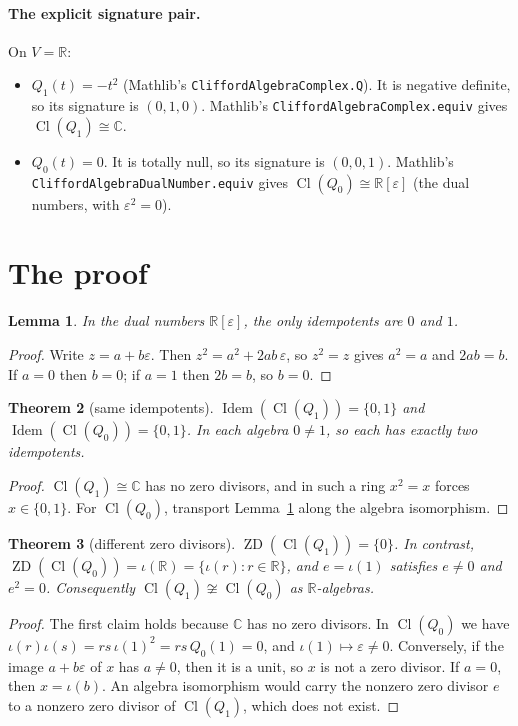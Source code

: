 \documentclass[11pt]{article}
\newtheorem{theorem}{Theorem}
\newtheorem{lemma}[theorem]{Lemma}
\theoremstyle{definition}
\theoremstyle{remark}
\renewcommand{\_}{\oldus\allowbreak}
\newcommand{\Cl}{\operatorname{Cl}}
\newcommand{\Idem}{\operatorname{Idem}}
\newcommand{\ZD}{\operatorname{ZD}}
\begin{document}
\paragraph{The explicit signature pair.} On $V=\mathbb{R}$:
\begin{itemize}
\item $Q_1(t)=-t^2$ (Mathlib's \texttt{CliffordAlgebraComplex.Q}). It is negative definite, so its
signature is $(0,1,0)$. Mathlib's \texttt{CliffordAlgebraComplex.equiv} gives
$\Cl(Q_1)\cong\mathbb{C}$.
\item $Q_0(t)=0$. It is totally null, so its signature is $(0,0,1)$. Mathlib's
\texttt{CliffordAlgebraDualNumber.equiv} gives $\Cl(Q_0)\cong\mathbb{R}[\varepsilon]$ (the dual
numbers, with $\varepsilon^2=0$).
\end{itemize}

\section{The proof}

\begin{lemma}\label{lem:dual}
In the dual numbers $\mathbb{R}[\varepsilon]$, the only idempotents are $0$ and $1$.
\end{lemma}
\begin{proof}
Write $z=a+b\varepsilon$. Then $z^2=a^2+2ab\,\varepsilon$, so $z^2=z$ gives $a^2=a$ and $2ab=b$.
If $a=0$ then $b=0$; if $a=1$ then $2b=b$, so $b=0$.
\end{proof}

\begin{theorem}[same idempotents]\label{thm:idem}
$\Idem(\Cl(Q_1))=\{0,1\}$ and $\Idem(\Cl(Q_0))=\{0,1\}$. In each algebra $0\neq1$, so each has
exactly two idempotents.
\end{theorem}
\begin{proof}
$\Cl(Q_1)\cong\mathbb{C}$ has no zero divisors, and in such a ring $x^2=x$ forces $x\in\{0,1\}$.
For $\Cl(Q_0)$, transport Lemma~\ref{lem:dual} along the algebra isomorphism.
\end{proof}

\begin{theorem}[different zero divisors]\label{thm:zd}
$\ZD(\Cl(Q_1))=\{0\}$. In contrast, $\ZD(\Cl(Q_0))=\iota(\mathbb{R})=\{\iota(r):r\in\mathbb{R}\}$,
and $e=\iota(1)$ satisfies $e\neq0$ and $e^2=0$. Consequently $\Cl(Q_1)\not\cong\Cl(Q_0)$ as
$\mathbb{R}$-algebras.
\end{theorem}
\begin{proof}
The first claim holds because $\mathbb{C}$ has no zero divisors. In $\Cl(Q_0)$ we have
$\iota(r)\iota(s)=rs\,\iota(1)^2=rs\,Q_0(1)=0$, and $\iota(1)\mapsto\varepsilon\neq0$. Conversely, if
the image $a+b\varepsilon$ of $x$ has $a\neq0$, then it is a unit, so $x$ is not a zero divisor.
If $a=0$, then $x=\iota(b)$. An algebra isomorphism would carry the nonzero zero divisor $e$ to a
nonzero zero divisor of $\Cl(Q_1)$, which does not exist.
\end{proof}
\end{document}
